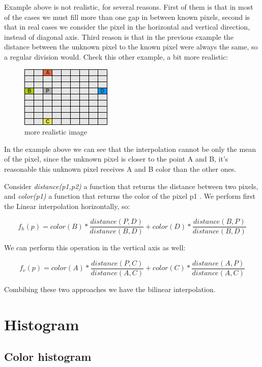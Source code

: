 \documentclass{article}
\begin{document}
	Example above is not realistic, for several reasons. First of them is that in most of the cases we must fill more than one gap in between known pixels,
	second is that in real cases we consider the pixel in the horizontal and vertical direction, instead of diagonal axis. Third reason is that in the 
	previous example the distance between the unknown pixel to the known pixel were always the same, so a regular division would. 
	Check this other example, a bit more realistic:
	
	\begin{figure} [H]
		\centering
		\includegraphics[scale=1]{images/bilinear_interpolation_3}
		\caption{more realistic image\label{bilinear3}}
	\end{figure}
	
	In the example above we can see that the interpolation cannot be only the mean of the pixel, since the unknown pixel 
	is closer to the point A and B, it's reasonable 
	this unknown pixel receives A and B color than the other ones.

	Consider \textit{distance(p1,p2)} a function that returns the distance between two pixels, 
	and \textit{color(p1)} a function that returns the color of the pixel p1 . We perform first the Linear interpolation horizontally, so:

	\[ f_h(p)=color(B)*\frac{distance(P,D)}{distance(B,D)}+color(D)*\frac{distance(B,P)}{distance(B,D)}  \]

	We can perform this operation in the vertical axis as well:

	\[ f_v(p)=color(A)*\frac{distance(P,C)}{distance(A,C)}+color(C)*\frac{distance(A,P)}{distance(A,C)}  \]

	Combibing these two approaches we have the bilinear interpolation.

	
\section{Histogram}

	\subsection{Color histogram}
\end{document}
